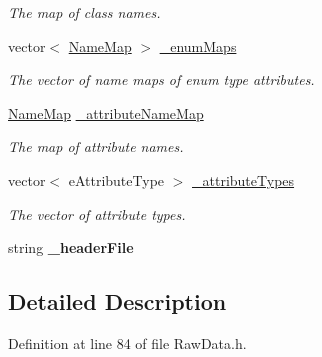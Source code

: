 \begin{DoxyCompactItemize}
\begin{DoxyCompactList}\small\item\em The map of class names. \end{DoxyCompactList}\item 
\hypertarget{classMultiBoost_1_1RawData_ae98f220c7dd6f35c33a611f5a2c83cd2}{vector$<$ \hyperlink{classMultiBoost_1_1NameMap}{Name\-Map} $>$ \hyperlink{classMultiBoost_1_1RawData_ae98f220c7dd6f35c33a611f5a2c83cd2}{\-\_\-enum\-Maps}}\label{classMultiBoost_1_1RawData_ae98f220c7dd6f35c33a611f5a2c83cd2}

\begin{DoxyCompactList}\small\item\em The vector of name maps of enum type attributes. \end{DoxyCompactList}\item 
\hypertarget{classMultiBoost_1_1RawData_a5e7e7258143aa6619bf0e82b84afcb91}{\hyperlink{classMultiBoost_1_1NameMap}{Name\-Map} \hyperlink{classMultiBoost_1_1RawData_a5e7e7258143aa6619bf0e82b84afcb91}{\-\_\-attribute\-Name\-Map}}\label{classMultiBoost_1_1RawData_a5e7e7258143aa6619bf0e82b84afcb91}

\begin{DoxyCompactList}\small\item\em The map of attribute names. \end{DoxyCompactList}\item 
\hypertarget{classMultiBoost_1_1RawData_a5cac1baeb4985810854c79d74c30a4d6}{vector$<$ e\-Attribute\-Type $>$ \hyperlink{classMultiBoost_1_1RawData_a5cac1baeb4985810854c79d74c30a4d6}{\-\_\-attribute\-Types}}\label{classMultiBoost_1_1RawData_a5cac1baeb4985810854c79d74c30a4d6}

\begin{DoxyCompactList}\small\item\em The vector of attribute types. \end{DoxyCompactList}\item 
\hypertarget{classMultiBoost_1_1RawData_a579e26d463a5b4128bb4d05b165c2d68}{string {\bfseries \-\_\-header\-File}}\label{classMultiBoost_1_1RawData_a579e26d463a5b4128bb4d05b165c2d68}

\end{DoxyCompactItemize}


\subsection{Detailed Description}


Definition at line 84 of file Raw\-Data.\-h.



